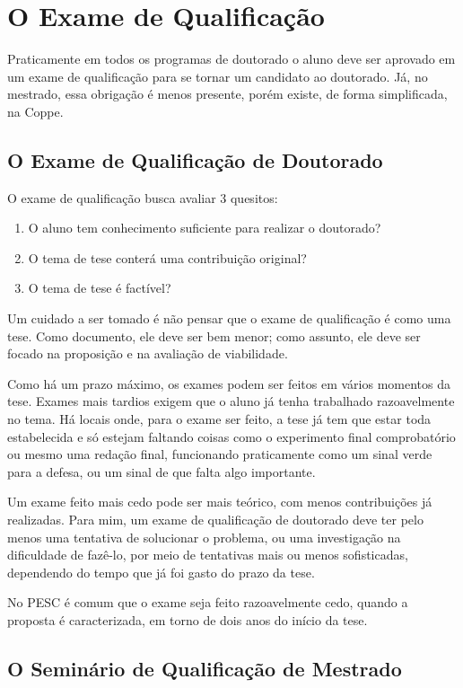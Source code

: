 \chapter{O Exame de Qualificação}

Praticamente em todos os programas de doutorado o aluno deve ser aprovado em um exame de qualificação para se tornar um candidato ao doutorado. Já, no mestrado, essa obrigação é menos presente, porém existe, de forma simplificada, na Coppe.

\section{O Exame de Qualificação de Doutorado}

O exame de qualificação busca avaliar 3 quesitos:

\begin{enumerate}
\item	O aluno tem conhecimento suficiente para realizar o doutorado?
\item	O tema de tese conterá uma contribuição original?
\item	O tema de tese é factível?
\end{enumerate}

Um cuidado a ser tomado é não pensar que o exame de qualificação é como uma tese. Como documento, ele deve ser bem menor; como assunto, ele deve ser focado na proposição e na avaliação de viabilidade.

Como há um prazo máximo, os exames podem ser feitos em vários momentos da tese. Exames mais tardios exigem que o aluno já tenha trabalhado razoavelmente no tema. Há locais onde, para o exame ser feito, a tese já tem que estar toda estabelecida e só estejam faltando coisas como o experimento final comprobatório ou mesmo uma redação final, funcionando praticamente como um sinal verde para a defesa, ou um sinal de que falta algo importante. 

Um exame feito mais cedo pode ser mais teórico, com menos contribuições já realizadas.
Para mim, um exame de qualificação de doutorado deve ter pelo menos uma tentativa de solucionar o problema, ou uma investigação na dificuldade de fazê-lo, por meio de tentativas mais ou menos sofisticadas, dependendo do tempo que já foi gasto do prazo da tese.

No PESC é comum que o exame seja feito razoavelmente cedo, quando a proposta é caracterizada, em torno de dois anos do início da tese.

\section{O Seminário de Qualificação de Mestrado}

